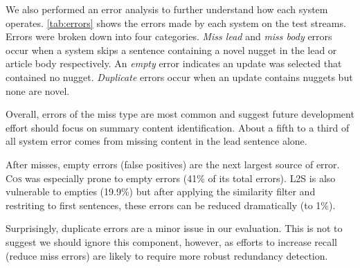 
 
We also performed an error analysis to further understand how each system
operates.  \autoref{tab:errors} shows the errors made by each system on the
test streams.  Errors were broken down into four categories. \emph{Miss lead}
and \emph{miss body} errors occur when a system skips a sentence containing a
novel nugget in the lead or article body respectively. An \emph{empty} error
indicates an update was selected that contained no nugget.  \emph{Duplicate}
errors occur when an update contains nuggets but none are novel. 
 
Overall, errors of the miss type are most common and suggest future development
effort should focus on summary content identification.  About a fifth to a
third of all system error comes from missing content in the lead sentence
alone.
 
After misses, empty errors (false positives) are the next largest source of
error. \textsc{Cos} was especially prone to empty errors (41\% of its total
errors). \textsc{L2S} is also vulnerable to empties (19.9\%) but after applying
the similarity filter and restriting to first sentences, these errors can be
reduced dramatically (to 1\%).
  
Surprisingly, duplicate errors are a minor issue in our evaluation. This is not
to suggest we should ignore this component, however, as efforts to increase
recall (reduce miss errors) are likely to require more robust redundancy
detection. 
